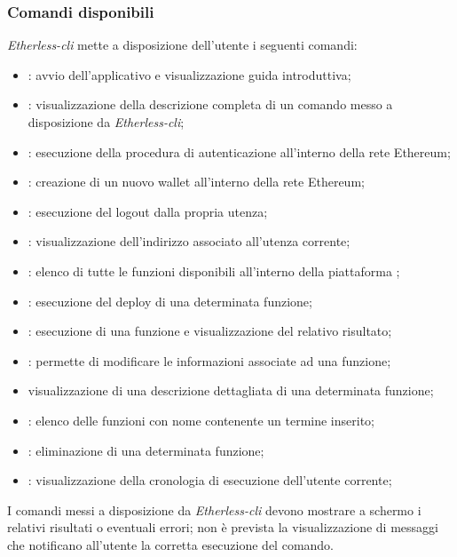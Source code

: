 \subsubsection{Comandi disponibili}
\textit{Etherless-cli} mette a disposizione dell'utente i seguenti comandi: 
\begin{itemize}
	\item \init{}: avvio dell'applicativo e visualizzazione guida introduttiva; 
	\item \help{}: visualizzazione della descrizione completa di un comando messo a disposizione da \textit{Etherless-cli}; 
	\item \login{}: esecuzione della procedura di autenticazione all'interno della rete Ethereum; 
	\item \signup{}: creazione di un nuovo wallet all'interno della rete Ethereum; 
	\item \logout{}: esecuzione del logout dalla propria utenza; 
	\item \whoami{}: visualizzazione dell'indirizzo associato all'utenza corrente; 
	\item \lista{}: elenco di tutte le funzioni disponibili all'interno della piattaforma \NomeProgetto{}; 
	\item \deploy{}: esecuzione del deploy di una determinata funzione;  
	\item \run{}: esecuzione di una funzione e visualizzazione del relativo risultato; 
	\item \edit{}: permette di modificare le informazioni associate ad una funzione; 
	\item \info{} visualizzazione di una descrizione dettagliata di una determinata funzione; 
	\item \search{}: elenco delle funzioni con nome contenente un termine inserito; 
	\item \delete{}: eliminazione di una determinata funzione;
	\item \history{}: visualizzazione della cronologia di esecuzione dell'utente corrente;  
\end{itemize}
I comandi messi a disposizione da \textit{Etherless-cli} devono mostrare a schermo i relativi risultati o eventuali errori; non è prevista la visualizzazione di messaggi che notificano all'utente la corretta esecuzione del comando. 

